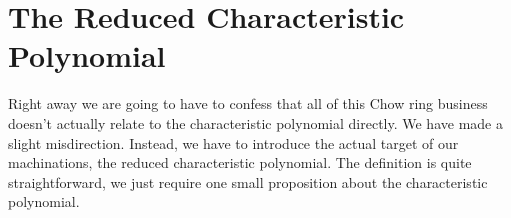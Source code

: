 \documentclass[12pt,oneside]{../../sfsuthesis}
\begin{document}
\section{The Reduced Characteristic Polynomial}

Right away we are going to have to confess that all of this Chow ring business doesn't actually relate to the characteristic polynomial directly.
We have made a slight misdirection.
Instead, we have to introduce the actual target of our machinations, the reduced characteristic polynomial.
The definition is quite straightforward, we just require one small proposition about the characteristic polynomial.

\end{document}
